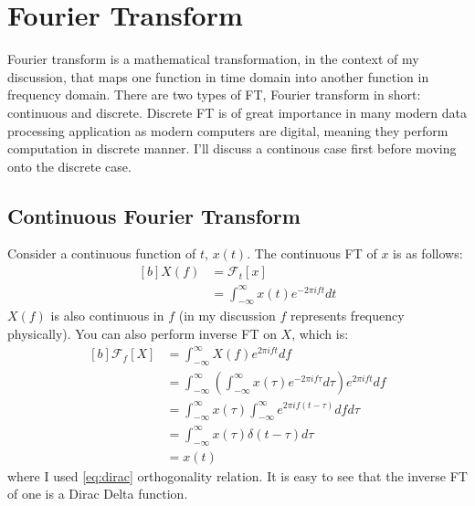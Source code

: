 \documentclass[letterpaper, 11pt]{article}
\newcommand{\fourier}[2]{\mathcal{F}_{#1}[#2]} %
\newcommand{\fint}{\int_{-\infty}^{\infty}} %
\newcommand{\ft}[2]{\fint #2 e^{-2\pi if#1} d#1} %
\newcommand{\ift}[2]{\fint #2 e^{2\pi i#1t} d#1} %
\numberwithin{equation}{section}
\begin{document}
\section{Fourier Transform}
Fourier transform is a mathematical transformation, in the context of my discussion, that maps one function in time domain into another function in frequency domain. There are two types of FT, Fourier transform in short: continuous and discrete. Discrete FT is of great importance in many modern data processing application as modern computers are digital, meaning they perform computation in discrete manner. I'll discuss a continous case first before moving onto the discrete case.

\subsection{Continuous Fourier Transform}
Consider a continuous function of \(t\), \(x(t)\). The continuous FT of \(x\) is as follows:
\begin{equation}
	\begin{aligned}[b]
		X(f)	&=\fourier{t}{x} \\
			&=\ft{t}{x(t)}
	\end{aligned}
\end{equation}
\(X(f)\) is also continuous in \(f\) (in my discussion \(f\) represents frequency physically). You can also perform inverse FT on \(X\), which is:
\begin{equation}
	\begin{aligned}[b]
		\fourier{f}{X}	&= \ift{f}{X(f)} \\
				&= \ift{f}{\left ( \ft{\tau}{x(\tau)}\right )} \\
				&= \fint x(\tau) \fint e^{2\pi if(t - \tau)} df d\tau \\
				&= \fint x(\tau) \delta (t - \tau) d\tau \\
				&= x(t)
	\end{aligned}
\end{equation}
where I used \eqref{eq:dirac} orthogonality relation. It is easy to see that the inverse FT of one is a Dirac Delta function.

\end{document}
